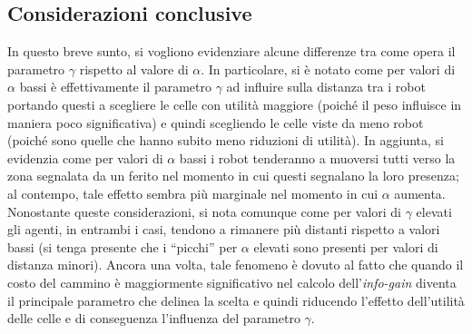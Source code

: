 \subsection{Considerazioni conclusive}
In questo breve sunto, si vogliono evidenziare alcune differenze tra come opera il parametro $\gamma$ rispetto al valore di $\alpha$.
In particolare, si è notato come per valori di $\alpha$ bassi è effettivamente il parametro $\gamma$ ad influire sulla distanza tra i robot portando questi a scegliere le celle con utilità maggiore (poiché il peso influisce in maniera poco significativa) e quindi scegliendo le celle viste da meno robot (poiché sono quelle che hanno subito meno riduzioni di utilità).
In aggiunta, si evidenzia come per valori di $\alpha$ bassi i robot tenderanno a muoversi tutti verso la zona segnalata da un ferito nel momento in cui questi segnalano la loro presenza; al contempo, tale effetto sembra più marginale nel momento in cui $\alpha$ aumenta.
Nonostante queste considerazioni, si nota comunque come per valori di $\gamma$ elevati gli agenti, in entrambi i casi, tendono a rimanere più distanti rispetto a valori bassi (si tenga presente che i “picchi” per $\alpha$ elevati sono presenti per valori di distanza minori).
Ancora una volta, tale fenomeno è dovuto al fatto che quando il costo del cammino è maggiormente significativo nel calcolo dell'\textit{info-gain} diventa il principale parametro che delinea la scelta e quindi riducendo l'effetto dell'utilità delle celle e di conseguenza l'influenza del parametro $\gamma$.
